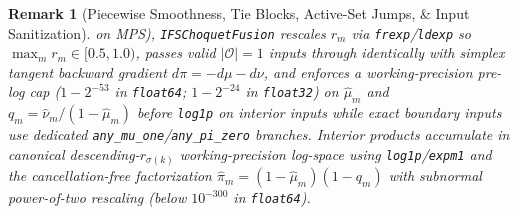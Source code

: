 \documentclass[10pt,twocolumn]{article}
\newtheorem{remark}{Remark}
\begin{document}
\begin{remark}[Piecewise Smoothness, Tie Blocks, Active-Set Jumps, \& Input Sanitization]
on MPS), \texttt{IFSChoquetFusion} rescales $r_m$ via \texttt{frexp}/\texttt{ldexp} so $\max_m
r_m \in [0.5, 1.0)$, passes valid $|\mathcal{O}|=1$ inputs through identically with simplex
tangent backward gradient $d\pi = -d\mu - d\nu$, and enforces a working-precision pre-log cap
($1 - 2^{-53}$ in \texttt{float64}; $1 - 2^{-24}$ in \texttt{float32}) on $\hat{\mu}_m$ and
$q_m = \hat{\nu}_m/(1-\hat{\mu}_m)$ before \texttt{log1p} on interior inputs while exact
boundary inputs use dedicated \texttt{any\_mu\_one}/\texttt{any\_pi\_zero} branches. Interior
products accumulate in canonical descending-$r_{\sigma(k)}$ working-precision log-space using
\texttt{log1p}/\texttt{expm1} and the cancellation-free factorization $\hat{\pi}_m = (1 -
\hat{\mu}_m)(1 - q_m)$ with subnormal power-of-two rescaling (below $10^{-300}$ in
\texttt{float64}).
\end{remark}
\end{document}
